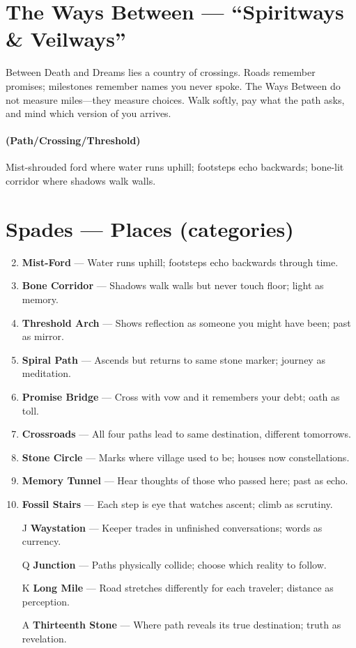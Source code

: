 \section{The Ways Between --- ``Spiritways \& Veilways''}
\label{chap:ways-between}

\begin{tcolorbox}[colback=black!3,colframe=black!40!white,title={Theme \& Atmosphere}]
Between Death and Dreams lies a country of crossings. Roads remember promises; milestones remember names you never spoke. The Ways Between do not measure miles---they measure choices. Walk softly, pay what the path asks, and mind which version of you arrives.
\end{tcolorbox}

\paragraph*{(Path/Crossing/Threshold)} Mist-shrouded ford where water runs uphill; footsteps echo backwards; bone-lit corridor where shadows walk walls.

\section*{Spades --- Places (categories)}
\label{sec:ways-between-places}
\begin{enumerate}
\setcounter{enumi}{1}
\item \textbf{Mist-Ford} --- Water runs uphill; footsteps echo backwards through time.
\item \textbf{Bone Corridor} --- Shadows walk walls but never touch floor; light as memory.
\item \textbf{Threshold Arch} --- Shows reflection as someone you might have been; past as mirror.
\item \textbf{Spiral Path} --- Ascends but returns to same stone marker; journey as meditation.
\item \textbf{Promise Bridge} --- Cross with vow and it remembers your debt; oath as toll.
\item \textbf{Crossroads} --- All four paths lead to same destination, different tomorrows.
\item \textbf{Stone Circle} --- Marks where village used to be; houses now constellations.
\item \textbf{Memory Tunnel} --- Hear thoughts of those who passed here; past as echo.
\item \textbf{Fossil Stairs} --- Each step is eye that watches ascent; climb as scrutiny.
\item[J] \textbf{Waystation} --- Keeper trades in unfinished conversations; words as currency.
\item[Q] \textbf{Junction} --- Paths physically collide; choose which reality to follow.
\item[K] \textbf{Long Mile} --- Road stretches differently for each traveler; distance as perception.
\item[A] \textbf{Thirteenth Stone} --- Where path reveals its true destination; truth as revelation.
\end{enumerate}

